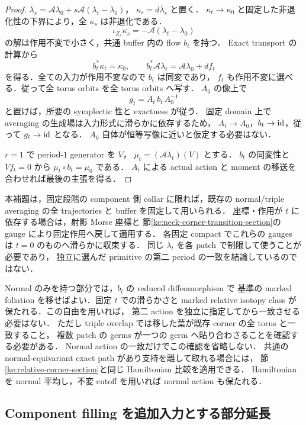 \begin{proof}
$\bar\lambda_s=\mathcal A\lambda_0+s\mathcal A(\lambda_t-\lambda_0)$，
$\kappa_s=d\bar\lambda_s$ と置く．
$\kappa_t\to\kappa_0$ と固定した非退化性の下界により，全 $\kappa_s$ は非退化である．
\[
 \iota_{Z_s}\kappa_s=-\mathcal A(\lambda_t-\lambda_0)
\]
の解は作用不変で小さく，共通 buffer 内の flow $b_t$ を持つ．
Exact transport の計算から
\[
 b_t^*\kappa_t=\kappa_0,\qquad
 b_t^*\mathcal A\lambda_t=\mathcal A\lambda_0+df_t
\]
を得る．全ての入力が作用不変なので $b_t$ は同変であり，
$f_t$ も作用不変に選べる．従って全 torus orbits を全 torus orbits へ写す．
$A_0$ の像上で
\[
 g_t=A_t\,b_t\,A_0^{-1}
\]
と置けば，所要の symplectic 性と exactness が従う．
固定 domain 上で averaging の生成場は入力形式に滑らかに依存するため，
$A_t\to A_0$，$b_t\to\operatorname{id}$，従って $g_t\to\operatorname{id}$ となる．
$A_0$ 自体が恒等写像に近いと仮定する必要はない．

$r=1$ で period-$1$ generator を $V$，
$\mu_t=(\mathcal A\lambda_t)(V)$ とする．
$b_t$ の同変性と $Vf_t=0$ から $\mu_t\circ b_t=\mu_0$ である．
$A_t$ による actual action と moment の移送を合わせれば最後の主張を得る．
\end{proof}

本補題は，固定段階の component 側 collar に限れば，既存の normal/triple
averaging の全 trajectories と buffer を固定して用いられる．
座標・作用が $t$ に依存する場合は，射影 Morse 座標と
節\ref{ke:neck-corner-transition-section}の gauge により固定作用へ戻して適用する．
各固定 compact でこれらの gauges は $t=0$ のものへ滑らかに収束する．
同じ $\lambda_t$ を各 patch で制限して使うことが必要であり，
独立に選んだ primitive の第二 period の一致を結論しているのではない．

Normal のみを持つ部分では，$b_t$ の reduced diffeomorphism で
基準の marked foliation を移せばよい．固定 $t$ での滑らかさと
marked relative isotopy class が保たれる．この自由を用いれば，
第二 action を独立に指定してから一致させる必要はない．
ただし triple overlap では移した葉が既存 corner の全 torus と一致すること，
複数 patch の germs が一つの germ へ貼り合わさることを確認する必要がある．
Normal action の一致だけでこの確認を省略しない．
共通の normal-equivariant exact path があり支持を離して取れる場合には，
節\ref{ke:relative-corner-section}と同じ Hamiltonian 比較を適用できる．
Hamiltonian を normal 平均し，不変 cutoff を用いれば normal action も保たれる．

\subsection{Component filling を追加入力とする部分延長}

